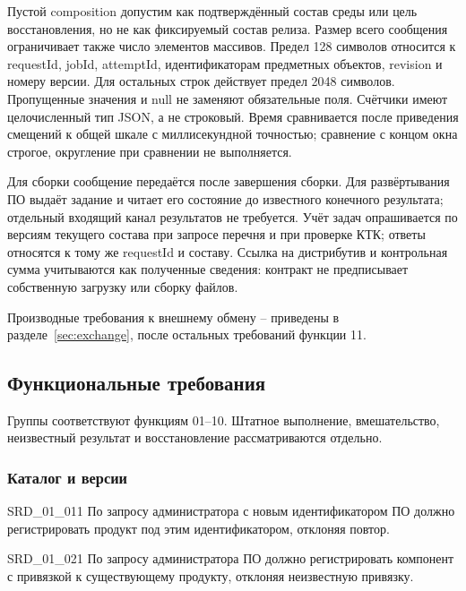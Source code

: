 \documentclass{tpks}
\begin{document}
Пустой composition допустим как подтверждённый состав среды или цель восстановления, но не как фиксируемый состав релиза. Размер всего сообщения ограничивает также число элементов массивов. Предел 128 символов относится к requestId, jobId, attemptId, идентификаторам предметных объектов, revision и номеру версии. Для остальных строк действует предел 2048 символов. Пропущенные значения и null не заменяют обязательные поля. Счётчики имеют целочисленный тип JSON, а не строковый. Время сравнивается после приведения смещений к общей шкале с миллисекундной точностью; сравнение с концом окна строгое, округление при сравнении не выполняется.

Для сборки сообщение передаётся после завершения сборки. Для развёртывания ПО выдаёт задание и читает его состояние до известного конечного результата; отдельный входящий канал результатов не требуется. Учёт задач опрашивается по версиям текущего состава при запросе перечня и при проверке КТК; ответы относятся к тому же requestId и составу. Ссылка на дистрибутив и контрольная сумма учитываются как полученные сведения: контракт не предписывает собственную загрузку или сборку файлов.

Производные требования к внешнему обмену  --  приведены в разделе~\ref{sec:exchange}, после остальных требований функции 11.
\subsection{Функциональные требования}
Группы соответствуют функциям 01--10. Штатное выполнение, вмешательство, неизвестный результат и восстановление рассматриваются отдельно.
\subsubsection{Каталог и версии}

\begin{req}{SRD_01_01}{1}
По запросу администратора с новым идентификатором ПО должно регистрировать продукт под этим идентификатором, отклоняя повтор.
\end{req}

\begin{req}{SRD_01_02}{1}
По запросу администратора ПО должно регистрировать компонент с привязкой к существующему продукту, отклоняя неизвестную привязку.
\end{req}
\end{document}
